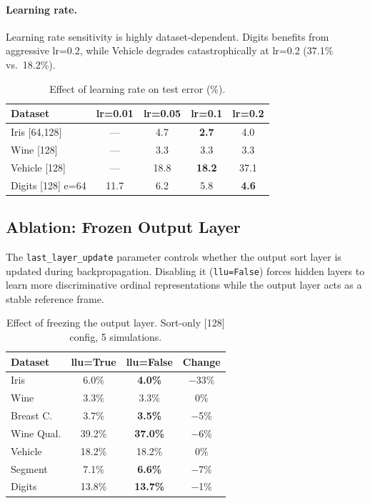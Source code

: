 \documentclass[12pt]{article}
\begin{document}
\paragraph{Learning rate.}
Learning rate sensitivity is highly dataset-dependent. Digits benefits from aggressive $\mathrm{lr}$=0.2, while Vehicle degrades catastrophically at $\mathrm{lr}$=0.2 (37.1\% vs.\ 18.2\%).

\begin{table}[ht]
\centering
\caption{Effect of learning rate on test error (\%).}
\label{tab:lr}
\begin{tabular}{lcccc}
\toprule
Dataset & lr=0.01 & lr=0.05 & lr=0.1 & lr=0.2 \\
\midrule
Iris [64,128]       & --- & 4.7 & \textbf{2.7} & 4.0 \\
Wine [128]          & --- & 3.3 & 3.3 & 3.3 \\
Vehicle [128]       & --- & 18.8 & \textbf{18.2} & 37.1 \\
Digits [128] e=64   & 11.7 & 6.2 & 5.8 & \textbf{4.6} \\
\bottomrule
\end{tabular}
\end{table}

\subsection{Ablation: Frozen Output Layer}

The \texttt{last\_layer\_update} parameter controls whether the output sort layer is updated during backpropagation. Disabling it (\texttt{llu=False}) forces hidden layers to learn more discriminative ordinal representations while the output layer acts as a stable reference frame.

\begin{table}[ht]
\centering
\caption{Effect of freezing the output layer. Sort-only [128] config, 5 simulations.}
\label{tab:llu}
\begin{tabular}{lccc}
\toprule
Dataset & llu=True & llu=False & Change \\
\midrule
Iris         & 6.0\% & \textbf{4.0\%} & $-$33\% \\
Wine         & 3.3\% & 3.3\% & 0\% \\
Breast C.    & 3.7\% & \textbf{3.5\%} & $-$5\% \\
Wine Qual.   & 39.2\% & \textbf{37.0\%} & $-$6\% \\
Vehicle      & 18.2\% & 18.2\% & 0\% \\
Segment      & 7.1\% & \textbf{6.6\%} & $-$7\% \\
Digits       & 13.8\% & \textbf{13.7\%} & $-$1\% \\
\bottomrule
\end{tabular}
\end{table}
\end{document}
